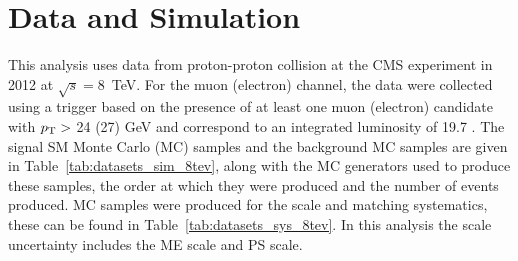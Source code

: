 


\section{Data and Simulation}
\label{sec:datasimulation}
This analysis uses data from proton-proton collision at the CMS experiment in 2012 at $\sqrt{s}=8$~TeV.
For the muon (electron) channel, the data were collected using a trigger based on the presence of at least one muon (electron) candidate with $p_{\mathrm{T}} > $ 24 (27) GeV and correspond to an integrated luminosity of 19.7 \fbinv .
The signal SM \tttt Monte Carlo (MC) samples and the background MC samples are given in Table~\ref{tab:datasets_sim_8tev}, along with the MC generators used to produce these samples, the order at which they were produced and the number of events produced. MC samples were produced for the scale and matching systematics, these can be found in Table~\ref{tab:datasets_sys_8tev}. In this analysis the scale uncertainty includes the ME scale and PS scale.


